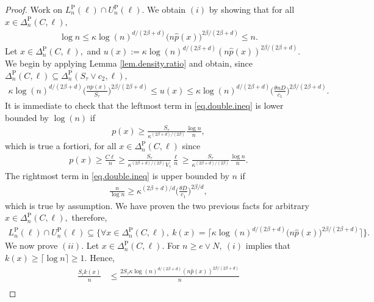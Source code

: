 \documentclass[10pt]{article}
\renewcommand{\P}{\operatorname{P}}
\renewcommand{\k}{\kappa}
\newcommand{\wh}{\widehat}
\begin{document}
\begin{proof}
    Work on $L_n^{\P}(\ell)\cap U_n^{\P}(\ell).$ We obtain $(i)$ by showing that for all $x \in \Delta_n^{\P}(C, \ell),$
    \begin{align*}
        \log n \leq \k\log(n)^{d/(2\beta + d)}\big(n\wh p(x)\big)^{2\beta/(2\beta + d)} \leq n.
    \end{align*}
    Let $x \in \Delta_n^{\P}(C, \ell),$ and $u(x) := \k\log(n)^{d/(2\beta + d)}(n\wh p(x))^{2\beta/(2\beta + d)}.$ We begin by applying Lemma \ref{lem.density.ratio} and obtain, since $\Delta_n^{\P}(C, \ell) \subseteq \Delta_n^{\P}(S_\tau \vee c_2, \ell),$
    \begin{align}
        \label{eq.double.ineq}
        \k\log(n)^{d/(2\beta + d)}\bigg(\frac{np(x)}{S_\tau}\bigg)^{2\beta/(2\beta + d)} \leq u(x) \leq \k\log(n)^{d/(2\beta + d)}\bigg(\frac{\theta n D}{c_1}\bigg)^{2\beta/(2\beta + d)}.
    \end{align}
    It is immediate to check that the leftmost term in \eqref{eq.double.ineq} is lower bounded by $\log(n)$ if
    \begin{align*}
        p(x) \geq \frac{S_\tau}{\k^{(2\beta + d)/(2\beta)}}\frac{\log n}{n},
    \end{align*}
    which is true a fortiori, for all $x \in \Delta_n^{\P}(C, \ell)$ since
    \begin{align*}
        p(x) \geq \frac{C\ell}{n} \geq \frac{S_\tau}{\k^{(2\beta + d)/(2\beta)}V_\tau}\frac{\ell}{n} \geq \frac{S_\tau}{\k^{(2\beta + d)/(2\beta)}}\frac{\log n}{n}.
    \end{align*}
    The rightmost term in \eqref{eq.double.ineq} is upper bounded by $n$ if
    \begin{align*}
        \frac n{\log n} \geq \k^{(2\beta + d)/d}\bigg(\frac{\theta D}{c_1}\bigg)^{2\beta/d},
    \end{align*}
    which is true by assumption. We have proven the two previous facts for arbitrary $x \in \Delta_n^{\P}(C, \ell),$ therefore,
    \begin{align*}
        L_n^{\P}(\ell)\cap U_n^{\P}(\ell) \subseteq \Bigg\{\forall x \in \Delta_n^{\P}(C, \ell), \ k(x) = \Big\lceil\k\log(n)^{d/(2\beta + d)}\big(n\wh p(x)\big)^{2\beta/(2\beta + d)}\Big\rceil\Bigg\}.
    \end{align*}
    We now prove $(ii).$ Let $x \in \Delta_n^{\P}(C, \ell).$ For $n \geq e \vee N, \ (i)$ implies that $k(x) \geq \lceil \log n\rceil \geq 1.$ Hence, 
\begin{align*}
    \frac {S_\tau k(x)}n &\leq \frac{2S_\tau\k\log(n)^{d/(2\beta + d)}(n\wh p(x))^{2\beta/(2\beta + d)}}{n}\\

\end{align*}
\end{proof}
\end{document}
